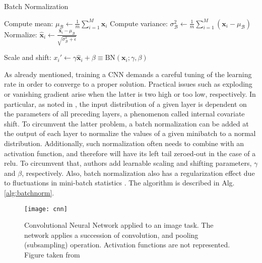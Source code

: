 \begin{algorithm}
  \label{alg:batchnorm}
 \caption{Batch Normalization}
 \begin{algorithmic}[1]
    \State Compute mean: $\mu_{\mathcal{B}}\leftarrow \frac{1}{m}\sum_{i=1}^{M}\bm{x}_{i}$
    \State Compute variance: $\sigma^{2}_{\mathcal{B}}\leftarrow \frac{1}{m}\sum_{i=1}^{M}(\bm{x}_{i}-\mu_{\mathcal{B}})$
    \State Normalize: $\hat{\bm{x}}_{i}\leftarrow \frac{\bm{x}_{i}-\mu_{\mathcal{B}}}{\sqrt{\sigma^{2}_{\mathcal{B}} + \epsilon}}$

    \State Scale and shift: $x_{i}'\leftarrow \gamma \hat{\bm{x}}_{i} + \beta \equiv \text{BN}(\bm{x}_{i};\gamma,\beta)$
 \end{algorithmic}
\end{algorithm}


As already mentioned, training a CNN demands a careful tuning of the learning rate in order to converge to a proper solution.
Practical issues such as exploding or vanishing gradient arise when the latter is two high or too low, respectively.
In particular, as noted in \cite{ioffe15}, the input distribution of a given layer is dependent on the parameters of all preceding layers, a phenomenon called internal covariate shift.
To circumvent the latter problem, a batch normalization can be added at the output of each layer to normalize the values of a given minibatch to a normal distribution.
Additionally, such normalization often needs to combine with an activation function, and therefore will have its left tail zeroed-out in the case of a \gls{relu}.
To circumvent that, authors add learnable scaling and shifting parameters, $\gamma$ and $\beta$, respectively.
Also, batch normalization also has a regularization effect due to fluctuations in mini-batch statistics \cite{gastaldi17}.
The algorithm is described in Alg. \ref{alg:batchnorm}.

\begin{figure}[!htpb]
  \centering
  \texttt{[image: cnn]}
  \caption{Convolutional Neural Network applied to an image task.
    The network applies a succession of convolution, and pooling (subsampling) operation.
  Activation functions are not represented. Figure taken from \cite{lecun95}}
  \label{fig:cnn}
\end{figure}

